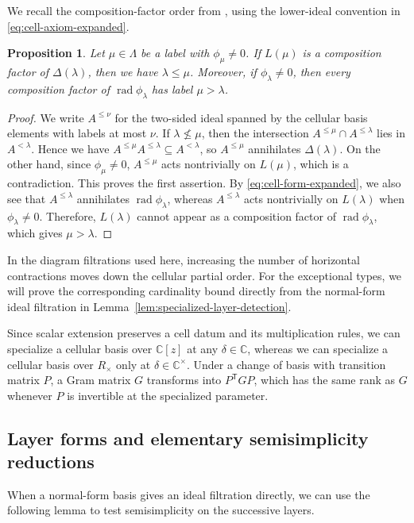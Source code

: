 \documentclass[11pt,a4paper]{amsart}
\newtheorem{proposition}[theorem]{Proposition}
\theoremstyle{uprightdefinition}
\theoremstyle{remark}\newtheorem{remark}[theorem]{Remark}
\begin{document}
We recall the composition-factor order from
\cite[Proposition~3.6]{GL1996}, using the lower-ideal convention in
\eqref{eq:cell-axiom-expanded}.
\begin{proposition}
\label{prop:cellular-order}
Let $\mu\in\Lambda$ be a label with $\phi_\mu\ne0$. If $L(\mu)$ is a
composition factor of $\Delta(\lambda)$, then we have
$\lambda\le\mu$. Moreover, if $\phi_\lambda\ne0$, then every composition factor
of $\operatorname{rad}\phi_\lambda$ has label $\mu>\lambda$.
\end{proposition}
\begin{proof}
We write $A^{\le\nu}$ for the two-sided ideal spanned by the cellular basis elements with labels at most $\nu$.
If $\lambda\not\le\mu$, then the intersection
$A^{\le\mu}\cap A^{\le\lambda}$ lies in $A^{<\lambda}$.
Hence we have $A^{\le\mu}A^{\le\lambda}\subseteq A^{<\lambda}$,
so $A^{\le\mu}$ annihilates $\Delta(\lambda)$.
On the other hand, since $\phi_\mu\ne0$, $A^{\le\mu}$ acts nontrivially on $L(\mu)$, which is a contradiction. This proves the first assertion.
By \eqref{eq:cell-form-expanded}, we also see that
$A^{\le\lambda}$ annihilates $\operatorname{rad}\phi_\lambda$, whereas
$A^{\le\lambda}$ acts nontrivially on $L(\lambda)$ when $\phi_\lambda\ne0$.
Therefore, $L(\lambda)$ cannot appear as a composition factor of $\operatorname{rad}\phi_\lambda$, which gives $\mu>\lambda$.
\end{proof}

In the diagram filtrations used here, increasing the number of horizontal contractions
moves down the cellular partial order. For the exceptional types, we will prove the corresponding cardinality
bound directly from the normal-form ideal filtration in Lemma~\ref{lem:specialized-layer-detection}.

Since scalar extension preserves a cell datum and its multiplication rules,
we can specialize a cellular basis over $\mathbb C[z]$ at any
$\delta\in\mathbb C$, whereas we can specialize a cellular basis over $R_\times$
only at $\delta\in\mathbb C^\times$. Under a change of basis with transition matrix $P$, a Gram matrix $G$ transforms into
$P^{\mathsf T}GP$, which has the same rank as $G$ whenever $P$
is invertible at the specialized parameter.

\subsection{Layer forms and elementary semisimplicity reductions}
When a normal-form basis gives an ideal filtration directly, we can use the following lemma to test semisimplicity on the successive layers.
\end{document}
